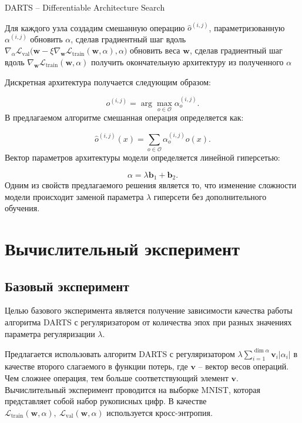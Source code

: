 \documentclass[12pt, twoside]{article}
\begin{document}
 \begin{algorithm}[H]
\begin{algorithmic}[1]
\caption{DARTS -- Differentiable Architecture Search}
\label{alg:darts}
\STATE Для каждого узла создадим смешанную операцию $\hat{o}^{(i, j)}$, параметризованную $\alpha^{(i, j)}$
\STATE  обновить $\alpha$, сделав градиентный шаг вдоль $\nabla_\alpha \mathcal{L}_\text{val}\bigl(\mathbf{w} - \xi\nabla_{\mathbf{w}}\mathcal{L}_\text{train}(\mathbf{w}, \alpha), \alpha\bigr)$
\STATE обновить веса $\mathbf{w}$, сделав градиентный шаг вдоль $\nabla_\mathbf{w}\mathcal{L}_\text{train}(\mathbf{w}, \alpha)$
\ENDWHILE
\STATE получить окончательную архитектуру из полученного $\alpha$
\end{algorithmic}
\end{algorithm}
Дискретная архитектура получается следующим образом:

$$o^{(i, j)} =\arg\max_{o\in\mathcal{O}}\alpha_o^{(i, j)}.$$
В предлагаемом алгоритме смешанная операция определяется как:
 
 $$\hat{o}^{(i, j)}(x) = \sum_{o\in \mathcal{O}}\alpha^{(i, j)}_oo(x).$$
Вектор параметров архитектуры модели определяется линейной гиперсетью:

$$\alpha = \lambda\mathbf{b}_1 + \mathbf{b}_2.$$
Одним из свойств предлагаемого решения является то, что изменение сложности модели происходит заменой параметра $\lambda$ гиперсети без дополнительного обучения.


 
 \section{Вычислительный эксперимент}
 
 \subsection{Базовый эксперимент}
 Целью базового эксперимента является получение зависимости качества работы алгоритма DARTS с регуляризатором от количества эпох при разных значениях параметра регуляризации $\lambda$.
 
 Предлагается использовать алгоритм DARTS с регуляризатором $\lambda\sum_{i=1}^{\dim\alpha}\mathbf{v}_i|\alpha_i|$ в качестве второго слагаемого в функции потерь, где $\mathbf{v}$ -- вектор весов операций. Чем сложнее операция, тем больше соответствующий элемент $\mathbf{v}$. Вычислительный эксперимент проводится на выборке MNIST\cite{lecun-mnisthandwrittendigit-2010}, которая представляет собой набор рукописных цифр. В качестве $\mathcal{L}_\text{train}(\mathbf{w}, \alpha), ~\mathcal{L}_\text{val}(\mathbf{w}, \alpha)$ используется кросс-энтропия.
 
\end{document}
